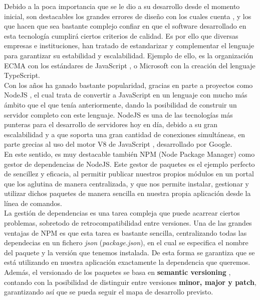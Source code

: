 Debido a la poca importancia que se le dio a su desarrollo desde el momento inicial, son destacables los grandes errores de diseño con los cuales cuenta \cite{KennethEng2019}, y los que hacen que sea bastante complejo confiar en que el software desarrollado en esta tecnología cumplirá ciertos criterios de calidad. Es por ello que diversas empresas e instituciones, han tratado de estandarizar y complementar el lenguaje para garantizar su estabilidad y escalabilidad. Ejemplo de ello, es la organización ECMA con los estándares de JavaScript \cite{ecmascript}, o Microsoft con la creación del lenguaje TypeScript.\\

Con los años ha ganado bastante popularidad, gracias en parte a proyectos como NodeJS \cite{node}, el cual trata de convertir a JavaScript en un lenguaje con mucho más ámbito que el que tenía anteriormente, dando la posibilidad de construir un servidor completo con este lenguaje. NodeJS es una de las tecnologías más punteras para el desarrollo de servidores hoy en día, debido a su gran escalabilidad y a que soporta una gran cantidad de conexiones simultáneas, en parte grecias al uso del motor V8 de JavaScript \cite{motor-v8}, desarrollado por Google. \\

En este sentido, es muy destacable también NPM (Node Package Manager) \cite{npm} como gestor de dependencias de NodeJS. Este gestor de paquetes es el ejemplo perfecto de sencillez y eficacia, al permitir publicar nuestros propios módulos en un portal que los aglutina de manera centralizada, y que nos permite instalar, gestionar y utilizar dichos paquetes de manera sencilla en nuestra propia aplicación desde la línea de comandos. \\

La gestión de dependencias es una tarea compleja que puede acarrear ciertos problemas, sobretodo de retrocompatibilidad entre versiones. Una de las grandes ventajas de NPM es que esta tarea es bastante sencilla, centralizando todas las dependecias en un fichero \textit{json} (\textit{package.json}), en el cual se especifica el nombre del paquete y la versión que tenemos instalada. De esta forma se garantiza que se está utilizando en nuestra aplicación exactamente la dependencia que queremos. \\

Además, el versionado de los paquetes se basa en \textbf{semantic versioning} \cite{semver}, contando con la posibilidad de distinguir entre versiones \textbf{minor, major y patch}, garantizando así que se pueda seguir el mapa de desarrollo previsto. \\

